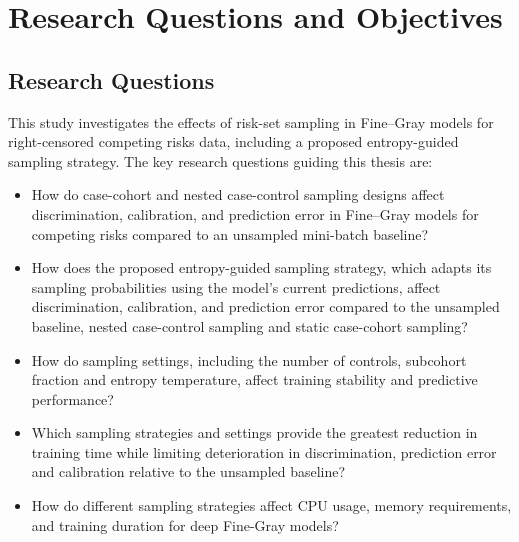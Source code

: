 \documentclass[a4paper,twoside,12pt]{report}
\begin{document}
\section{Research Questions and Objectives}

\subsection{Research Questions}
This study investigates the effects of risk-set sampling in Fine--Gray models for right-censored competing risks data, including a proposed entropy-guided sampling strategy. The key research questions guiding this thesis are:
\begin{itemize}
    \item How do case-cohort and nested case-control sampling designs affect discrimination, calibration, and prediction error in Fine--Gray models for competing risks compared to an unsampled mini-batch baseline?
    \item How does the proposed entropy-guided sampling strategy, which adapts its sampling probabilities using the model's current predictions, affect discrimination, calibration, and prediction error compared to the unsampled baseline, nested case-control sampling and static case-cohort sampling?
    \item How do sampling settings, including the number of controls, subcohort fraction and entropy temperature, affect training stability and predictive performance?
    \item Which sampling strategies and settings provide the greatest reduction in training time while limiting deterioration in discrimination, prediction error and calibration relative to the unsampled baseline?
    \item How do different sampling strategies affect CPU usage, memory requirements, and training duration for deep Fine-Gray models?
\end{itemize}
\end{document}
